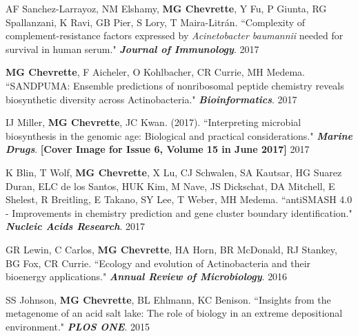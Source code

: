 \begin{cvpubs}
\cvpub
{AF Sanchez-Larrayoz, NM Elshamy, \textbf{MG Chevrette}, Y Fu, P Giunta, RG Spallanzani, K Ravi, GB Pier, S Lory, T Maira-Litr\'{a}n. ``Complexity of complement-resistance factors expressed by \textit{Acinetobacter baumannii} needed for survival in human serum." \textit{\textbf{Journal of Immunology}}. \textbf{\textit{}}}
{2017}

\cvpub
{\textbf{MG Chevrette}, F Aicheler, O Kohlbacher, CR Currie, MH Medema. ``SANDPUMA: Ensemble predictions of nonribosomal peptide chemistry reveals biosynthetic diversity across Actinobacteria." \textit{\textbf{Bioinformatics}}. \textbf{\textit{}}}
{2017}

\cvpub
{IJ Miller, \textbf{MG Chevrette}, JC Kwan. (2017). ``Interpreting microbial biosynthesis in the genomic age: Biological and practical considerations." \textit{\textbf{Marine Drugs}}. \textbf{\textit{}} \linebreak \textbf{[Cover Image for Issue 6, Volume 15 in June 2017]}}
{2017}

\cvpub
{K Blin, T Wolf, \textbf{MG Chevrette}, X Lu, CJ Schwalen, SA Kautsar, HG Suarez Duran, ELC de los Santos, HUK Kim, M Nave, JS Dickschat, DA Mitchell, E Shelest, R Breitling, E Takano, SY Lee, T Weber, MH Medema. ``antiSMASH 4.0 - Improvements in chemistry prediction and gene cluster boundary identification." \textit{\textbf{Nucleic Acids Research}}. \textbf{\textit{}}}
{2017}

\cvpub
{GR Lewin, C Carlos, \textbf{MG Chevrette}, HA Horn, BR McDonald, RJ Stankey, BG Fox, CR Currie. ``Ecology and evolution of Actinobacteria and their bioenergy applications." \textit{\textbf{Annual Review of Microbiology}}. \textbf{\textit{}}}
{2016}

\cvpub
{SS Johnson, \textbf{MG Chevrette}, BL Ehlmann, KC Benison. ``Insights from the metagenome of an acid salt lake: The role of biology in an extreme depositional environment."  \textit{\textbf{PLOS ONE}}. \textbf{\textit{}}}
{2015}

\end{cvpubs}

